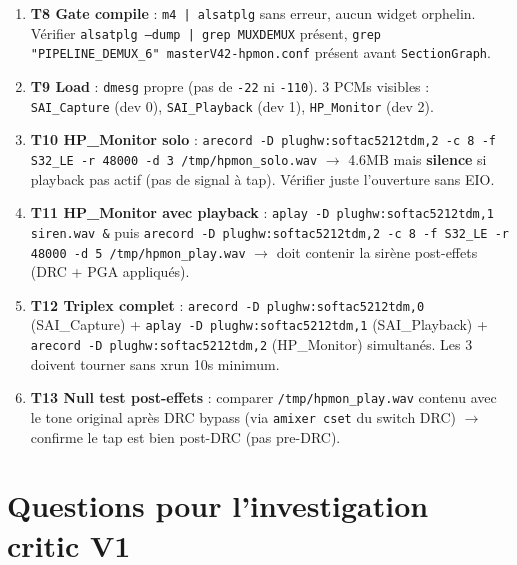 \documentclass[11pt,a4paper]{article}
\begin{document}
\begin{enumerate}[leftmargin=*, itemsep=2pt]
  \item \textbf{T8 Gate compile} : \texttt{m4 | alsatplg} sans erreur, aucun widget orphelin. Vérifier \texttt{alsatplg --dump | grep MUXDEMUX} présent, \texttt{grep "PIPELINE\_DEMUX\_6" masterV42-hpmon.conf} présent avant \texttt{SectionGraph}.
  \item \textbf{T9 Load} : \texttt{dmesg} propre (pas de \texttt{-22} ni \texttt{-110}). 3 PCMs visibles : \texttt{SAI\_Capture} (dev 0), \texttt{SAI\_Playback} (dev 1), \texttt{HP\_Monitor} (dev 2).
  \item \textbf{T10 HP\_Monitor solo} : \texttt{arecord -D plughw:softac5212tdm,2 -c 8 -f S32\_LE -r 48000 -d 3 /tmp/hpmon\_solo.wav} $\to$ 4.6MB mais \textbf{silence} si playback pas actif (pas de signal à tap). Vérifier juste l'ouverture sans EIO.
  \item \textbf{T11 HP\_Monitor avec playback} : \texttt{aplay -D plughw:softac5212tdm,1 siren.wav \&} puis \texttt{arecord -D plughw:softac5212tdm,2 -c 8 -f S32\_LE -r 48000 -d 5 /tmp/hpmon\_play.wav} $\to$ doit contenir la sirène post-effets (DRC + PGA appliqués).
  \item \textbf{T12 Triplex complet} : \texttt{arecord -D plughw:softac5212tdm,0} (SAI\_Capture) + \texttt{aplay -D plughw:softac5212tdm,1} (SAI\_Playback) + \texttt{arecord -D plughw:softac5212tdm,2} (HP\_Monitor) simultanés. Les 3 doivent tourner sans xrun 10s minimum.
  \item \textbf{T13 Null test post-effets} : comparer \texttt{/tmp/hpmon\_play.wav} contenu avec le tone original après DRC bypass (via \texttt{amixer cset} du switch DRC) $\to$ confirme le tap est bien post-DRC (pas pre-DRC).
\end{enumerate}

\section{Questions pour l'investigation critic V1}
\end{document}
